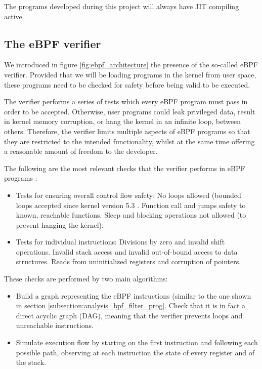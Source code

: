 The programs developed during this project will always have JIT compiling active.


\subsection{The eBPF verifier} \label{subsection:ebpf_verifier}
We introduced in figure \ref{fig:ebpf_architecture} the presence of the so-called eBPF verifier. Provided that we will be loading programs in the kernel from user space, these programs need to be checked for safety before being valid to be executed.

The verifier performs a series of tests which every eBPF program must pass in order to be accepted. Otherwise, user programs could leak privileged data, result in kernel memory corruption, or hang the kernel in an infinite loop, between others. Therefore, the verifier limits multiple aspects of eBPF programs so that they are restricted to the intended functionality, whilst at the same time offering a reasonable amount of freedom to the developer.

The following are the most relevant checks that the verifier performs in eBPF programs \cite{ebpf_verifier_kerneldocs} \cite{ebpf_JIT_demystify_page17-22}:
\begin{itemize}
\item Tests for ensuring overall control flow safety:
	\subitem No loops allowed (bounded loops accepted since kernel version 5.3 \cite{ebpf_bounded_loops}.
	\subitem Function call and jumps safety to known, reachable functions.
	\subitem Sleep and blocking operations not allowed (to prevent hanging the kernel).
\item Tests for individual instructions:
	 \subitem Divisions by zero and invalid shift operations.
	 \subitem Invalid stack access and invalid out-of-bound access to data structures.
	 \subitem Reads from uninitialized registers and corruption of pointers.
\end{itemize}

These checks are performed by two main algorithms:
\begin{itemize}
\item Build a graph representing the eBPF instructions (similar to the one shown in section \ref{subsection:analysis_bpf_filter_prog}. Check that it is in fact a direct acyclic graph (DAG), meaning that the verifier prevents loops and unreachable instructions.
\item Simulate execution flow by starting on the first instruction and following each possible path, observing at each instruction the state of every register and of the stack.
\end{itemize}


